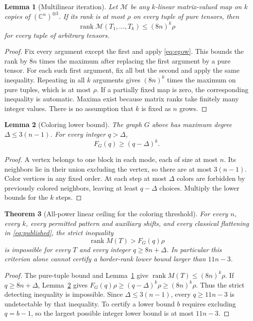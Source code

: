 \documentclass[11pt]{article}
\newtheorem{theorem}{Theorem}[section]
\newtheorem{lemma}[theorem]{Lemma}
\theoremstyle{definition}
\theoremstyle{remark}
\newcommand{\C}{\mathbb C}
\newcommand{\rank}{\operatorname{rank}}
\begin{document}
\begin{lemma}[Multilinear iteration]\label{lem:iterate}
Let $\mathcal M$ be any $k$-linear matrix-valued map on $k$ copies of $(\C^n)^{\otimes3}$. If its rank is at most $\rho$ on every tuple of pure tensors, then
\begin{equation}\label{eq:iterate}
 \rank\mathcal M(T_1,\ldots,T_k)\le (8n)^k\rho
\end{equation}
for every tuple of arbitrary tensors.
\end{lemma}
\begin{proof}
Fix every argument except the first and apply \eqref{eq:egow}. This bounds the rank by $8n$ times the maximum after replacing the first argument by a pure tensor. For each such first argument, fix all but the second and apply the same inequality. Repeating in all $k$ arguments gives $(8n)^k$ times the maximum on pure tuples, which is at most $\rho$. If a partially fixed map is zero, the corresponding inequality is automatic. Maxima exist because matrix ranks take finitely many integer values. There is no assumption that $k$ is fixed as $n$ grows.
\end{proof}

\begin{lemma}[Coloring lower bound]\label{lem:color}
The graph $G$ above has maximum degree $\Delta\le3(n-1)$. For every integer $q>\Delta$,
\[
 F_G(q)\ge(q-\Delta)^k.
\]
\end{lemma}
\begin{proof}
A vertex belongs to one block in each mode, each of size at most $n$. Its neighbors lie in their union excluding the vertex, so there are at most $3(n-1)$. Color vertices in any fixed order. At each step at most $\Delta$ colors are forbidden by previously colored neighbors, leaving at least $q-\Delta$ choices. Multiply the lower bounds for the $k$ steps.
\end{proof}

\begin{theorem}[All-power linear ceiling for the coloring threshold]\label{thm:linearceiling}
For every $n$, every $k$, every permitted pattern and auxiliary shifts, and every classical flattening in \eqref{eq:published}, the strict inequality
\[
 \rank M(T)>F_G(q)\rho
\]
is impossible for every $T$ and every integer $q\ge8n+\Delta$. In particular this criterion alone cannot certify a border-rank lower bound larger than $11n-3$.
\end{theorem}
\begin{proof}
The pure-tuple bound and Lemma~\ref{lem:iterate} give $\rank M(T)\le(8n)^k\rho$. If $q\ge8n+\Delta$, Lemma~\ref{lem:color} gives $F_G(q)\rho\ge(q-\Delta)^k\rho\ge(8n)^k\rho$. Thus the strict detecting inequality is impossible. Since $\Delta\le3(n-1)$, every $q\ge11n-3$ is undetectable by that inequality. To certify a lower bound $b$ requires excluding $q=b-1$, so the largest possible integer lower bound is at most $11n-3$.
\end{proof}
\end{document}

